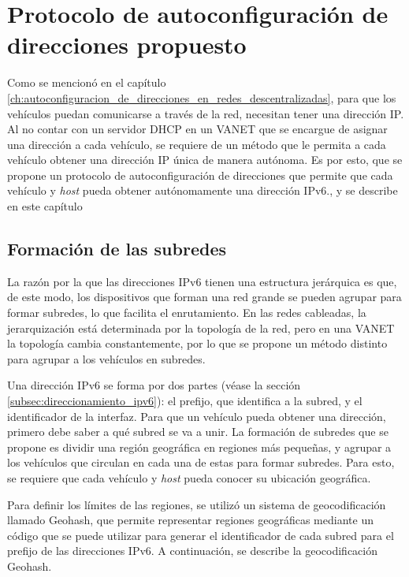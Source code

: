 ﻿\chapter{Protocolo de autoconfiguración de direcciones propuesto}
\label{ch:protocolo_autoconfiguracion_de_direcciones_propuesto}

Como se mencionó en el capítulo
\ref{ch:autoconfiguracion_de_direcciones_en_redes_descentralizadas}, para que
los vehículos puedan comunicarse a través de la red, necesitan tener una
dirección IP. Al no contar con un servidor DHCP en un VANET que se encargue de
asignar una dirección a cada vehículo, se requiere de un método que le permita
a cada vehículo obtener una dirección IP única de manera autónoma. Es por esto,
que se propone un protocolo de autoconfiguración de direcciones que permite que
cada vehículo y \textit{host} pueda obtener autónomamente una dirección IPv6., y
se describe en este capítulo

\section{Formación de las subredes}
\label{sec:formacion_de_subredes}

La razón por la que las direcciones IPv6 tienen una estructura jerárquica es
que, de este modo, los dispositivos que forman una red grande se pueden agrupar
para formar subredes, lo que facilita el enrutamiento. En las redes cableadas,
la jerarquización está determinada por la topología de la red, pero en una VANET
la topología cambia constantemente, por lo que se propone un método distinto
para agrupar a los vehículos en subredes.

Una dirección IPv6 se forma por dos partes (véase la sección
\ref{subsec:direccionamiento_ipv6}): el prefijo, que identifica a la subred, y
el identificador de la interfaz. Para que un vehículo pueda obtener una
dirección, primero debe saber a qué subred se va a unir. La formación de
subredes que se propone es dividir una región geográfica en regiones más
pequeñas, y agrupar a los vehículos que circulan en cada una de estas para
formar subredes. Para esto, se requiere que cada vehículo y \textit{host} pueda
conocer su ubicación geográfica.

Para definir los límites de las regiones, se utilizó un sistema de
geocodificación llamado Geohash, que permite representar regiones geográficas
mediante un código que se puede utilizar para generar el identificador de cada
subred para el prefijo de las direcciones IPv6. A continuación, se describe la
geocodificación Geohash.

